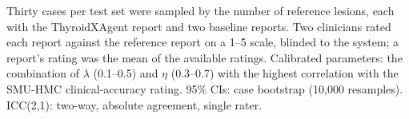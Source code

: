 \begin{table}[p]
\begin{threeparttable}
\begin{tablenotes}[flushleft]
\footnotesize
\item Thirty cases per test set were sampled by the number of reference lesions, each with the ThyroidXAgent report and two baseline reports. Two clinicians rated each report against the reference report on a 1--5 scale, blinded to the system; a report's rating was the mean of the available ratings. Calibrated parameters: the combination of $\lambda$ (0.1--0.5) and $\eta$ (0.3--0.7) with the highest correlation with the SMU-HMC clinical-accuracy rating. 95\% CIs: case bootstrap (10,000 resamples). ICC(2,1): two-way, absolute agreement, single rater.
\end{tablenotes}

\end{threeparttable}
\end{table}
